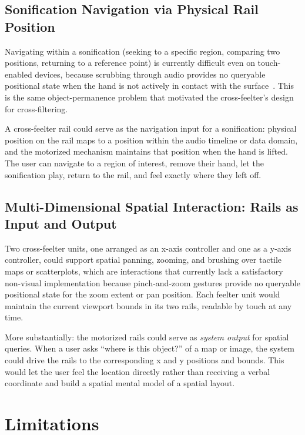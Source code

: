 \documentclass[12pt]{cmuthesis}
\begin{document}
\subsection{Sonification Navigation via Physical Rail Position} %

Navigating within a sonification (seeking to a specific region, comparing two positions, returning to a reference point) is currently difficult even on touch-enabled devices, because scrubbing through audio provides no queryable positional state when the hand is not actively in contact with the surface~\cite{Chundury2022Towards, Chundury2024, Chundury2026}. This is the same object-permanence problem that motivated the cross-feelter's design for cross-filtering.

A cross-feelter rail could serve as the navigation input for a sonification: physical position on the rail maps to a position within the audio timeline or data domain, and the motorized mechanism maintains that position when the hand is lifted. The user can navigate to a region of interest, remove their hand, let the sonification play, return to the rail, and feel exactly where they left off.

\subsection{Multi-Dimensional Spatial Interaction: Rails as Input and Output} %

Two cross-feelter units, one arranged as an x-axis controller and one as a y-axis controller, could support spatial panning, zooming, and brushing over tactile maps or scatterplots, which are interactions that currently lack a satisfactory non-visual implementation because pinch-and-zoom gestures provide no queryable positional state for the zoom extent or pan position. Each feelter unit would maintain the current viewport bounds in its two rails, readable by touch at any time.

More substantially: the motorized rails could serve as \textit{system output} for spatial queries. When a user asks ``where is this object?'' of a map or image, the system could drive the rails to the corresponding x and y positions and bounds. This would let the user feel the location directly rather than receiving a verbal coordinate and build a spatial mental model of a spatial layout.

\section{Limitations}
\label{sec:limitations} 
\end{document}
